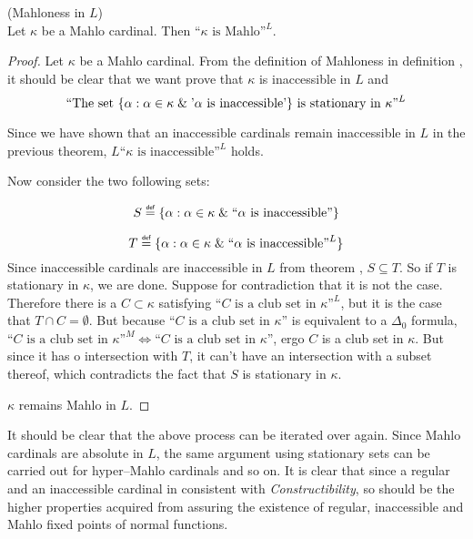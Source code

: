 \begin{theorem}{(Mahloness in $L$)}\label{theorem:mahlo_in_l}\\
Let $\kappa$ be a Mahlo cardinal. Then $\mbox{``$\kappa$ is Mahlo''}^L$.
\end{theorem}

\begin{proof}
Let $\kappa$ be a Mahlo cardinal. From the definition of Mahloness in definition , it should be clear that we want prove that $\kappa$ is inaccessible in $L$ and 
\begin{equation}
\mbox{``The set }\{\alpha : \alpha \in \kappa \mathrel{\&} \mbox{'$\alpha$ is inaccessible'}\}\mbox{ is stationary in $\kappa$''}^L
\end{equation}

Since we have shown that an inaccessible cardinals remain inaccessible in $L$ in the previous theorem, $L\mbox{``$\kappa$ is inaccessible''}^L$ holds.

Now consider the two following sets:
\bce[(i)]
\item \begin{equation}
S \defeq \{\alpha : \alpha \in \kappa \et \mbox{``$\alpha$ is inaccessible''}\}
\end{equation}
\item \begin{equation}
T \defeq \{\alpha : \alpha \in \kappa \et \mbox{``$\alpha$ is inaccessible''}^L\}
\end{equation} 
\ece 
Since inaccessible cardinals are inaccessible in $L$ from theorem , $S \subseteq T$.
So if $T$ is stationary in $\kappa$, we are done. Suppose for contradiction that it is not the case. 
Therefore there is a $C \subset \kappa$ satisfying $\mbox{``$C$ is a club set in $\kappa$''}^L$, but it is the case that $T \cap C = \emptyset$.
But because $\mbox{``$C$ is a club set in $\kappa$''}$ is equivalent to a $\Delta_0$ formula, $\mbox{``$C$ is a club set in $\kappa$''}^M \iff \mbox{``$C$ is a club set in $\kappa$''}$, ergo $C$ is a club set in $\kappa$. But since it has o intersection with $T$, it can't have an intersection with a subset thereof, which contradicts the fact that $S$ is stationary in $\kappa$.

$\kappa$ remains Mahlo in $L$.
\end{proof}

It should be clear that the above process can be iterated over again. Since Mahlo cardinals are absolute in $L$, the same argument using stationary sets can be carried out for hyper–Mahlo cardinals and so on. It is clear that since a regular and an inaccessible cardinal in consistent with \emph{Constructibility}, so should be the higher properties acquired from assuring the existence of regular, inaccessible and Mahlo fixed points of normal functions.


